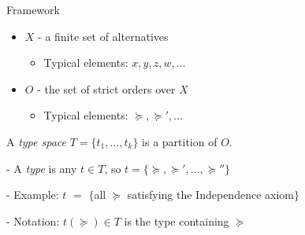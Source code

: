 \begin{frame}{Framework}{}

\begin{itemize}
\item $X$ - a finite set of alternatives

\begin{itemize}
  \item Typical elements: $x,y,z,w,\ldots$
\end{itemize}

\item $O$ - the set of strict orders over $X$

\begin{itemize}
  \item Typical elements: $\succeq, \succeq',\ldots$
\end{itemize}

\end{itemize}

\pause

\smallskip

\begin{definition}
  A \emph{type space} $T=\{t_1,\ldots,t_k\}$ is a partition of $O$.
\end{definition}

\bigskip

- A \emph{type} is any $t\in T$, so $t=\{\succeq,\succeq',...,\succeq''\}$

\medskip

- Example: $t$ $=$ $\{$all $\succeq$ satisfying the Independence axiom$\}$

\medskip

- Notation: $t(\succeq)\in T$ is the type containing $\succeq$

\end{frame}



